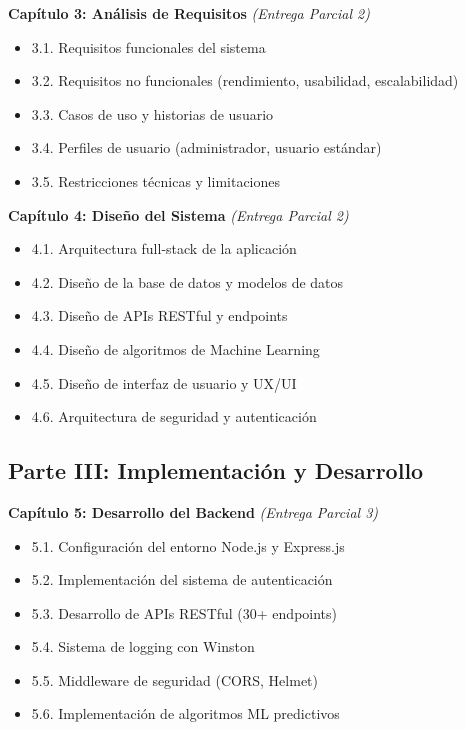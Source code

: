\documentclass[12pt,a4paper,spanish]{article}
\begin{document}
\textbf{Capítulo 3: Análisis de Requisitos} \textit{(Entrega Parcial 2)}
\begin{itemize}
    \item 3.1. Requisitos funcionales del sistema
    \item 3.2. Requisitos no funcionales (rendimiento, usabilidad, escalabilidad)
    \item 3.3. Casos de uso y historias de usuario
    \item 3.4. Perfiles de usuario (administrador, usuario estándar)
    \item 3.5. Restricciones técnicas y limitaciones
\end{itemize}

\textbf{Capítulo 4: Diseño del Sistema} \textit{(Entrega Parcial 2)}
\begin{itemize}
    \item 4.1. Arquitectura full-stack de la aplicación
    \item 4.2. Diseño de la base de datos y modelos de datos
    \item 4.3. Diseño de APIs RESTful y endpoints
    \item 4.4. Diseño de algoritmos de Machine Learning
    \item 4.5. Diseño de interfaz de usuario y UX/UI
    \item 4.6. Arquitectura de seguridad y autenticación
\end{itemize}

\subsection{Parte III: Implementación y Desarrollo}

\textbf{Capítulo 5: Desarrollo del Backend} \textit{(Entrega Parcial 3)}
\begin{itemize}
    \item 5.1. Configuración del entorno Node.js y Express.js
    \item 5.2. Implementación del sistema de autenticación
    \item 5.3. Desarrollo de APIs RESTful (30+ endpoints)
    \item 5.4. Sistema de logging con Winston
    \item 5.5. Middleware de seguridad (CORS, Helmet)
    \item 5.6. Implementación de algoritmos ML predictivos
\end{itemize}
\end{document}
